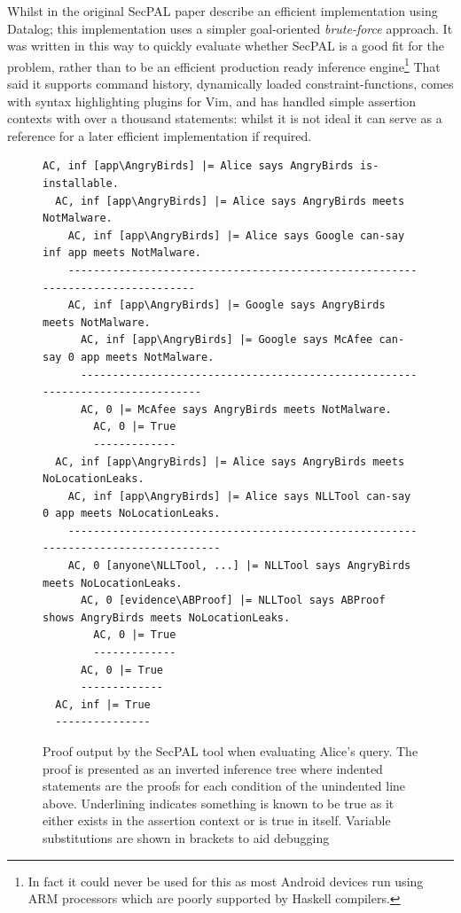 \documentclass[a4paper]{article}
\begin{document}
Whilst in the original SecPAL paper\cite{Becker:2010vh}
\citeauthor*{Becker:2010vh} describe an efficient implementation using Datalog;
this implementation uses a simpler goal-oriented \emph{brute-force} approach.
It was written in this way to quickly evaluate whether SecPAL is a good fit for
the problem, rather than to be an efficient production ready inference
engine\footnote{In fact it could never be used for this as most Android devices
  run using ARM processors which are poorly supported by Haskell compilers.}
That said it supports command history, dynamically loaded constraint-functions,
comes with syntax highlighting plugins for Vim, and has handled simple assertion
contexts with over a thousand statements: whilst it is not ideal it can serve as
a reference for a later efficient implementation if required.

\begin{figure}\label{secpal:exampleproof}
  \begin{lstlisting}[basicstyle=\footnotesize\ttfamily,columns=flexible,mathescape]
AC, inf [app\AngryBirds] |= Alice says AngryBirds is-installable.
  AC, inf [app\AngryBirds] |= Alice says AngryBirds meets NotMalware.
    AC, inf [app\AngryBirds] |= Alice says Google can-say inf app meets NotMalware.
    -------------------------------------------------------------------------------
    AC, inf [app\AngryBirds] |= Google says AngryBirds meets NotMalware.
      AC, inf [app\AngryBirds] |= Google says McAfee can-say 0 app meets NotMalware.
      ------------------------------------------------------------------------------
      AC, 0 |= McAfee says AngryBirds meets NotMalware.
        AC, 0 |= True
        -------------
  AC, inf [app\AngryBirds] |= Alice says AngryBirds meets NoLocationLeaks.
    AC, inf [app\AngryBirds] |= Alice says NLLTool can-say 0 app meets NoLocationLeaks.
    -----------------------------------------------------------------------------------
    AC, 0 [anyone\NLLTool, ...] |= NLLTool says AngryBirds meets NoLocationLeaks.
      AC, 0 [evidence\ABProof] |= NLLTool says ABProof shows AngryBirds meets NoLocationLeaks.
        AC, 0 |= True
        -------------
      AC, 0 |= True
      -------------
  AC, inf |= True
  ---------------
  \end{lstlisting}
  \caption{Proof output by the SecPAL tool when evaluating Alice's query.  The
    proof is presented as an inverted inference tree where indented statements
    are the proofs for each condition of the unindented line above.  Underlining
    indicates something is known to be true as it either exists in the assertion
    context or is true in itself. Variable substitutions are shown in brackets
    to aid debugging}
\end{figure}
\end{document}

